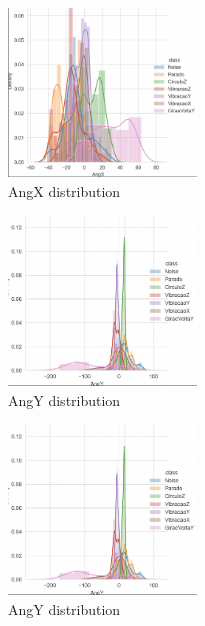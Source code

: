 \begin{figure}[H]
    \center
    \includegraphics[width=5cm]{images/AngXdistribution.png}
    \caption{ AngX distribution }
\end{figure}
\begin{figure}[H]
    \center
    \includegraphics[width=5cm]{images/AngYdistribution.png}
    \caption{ AngY distribution }
\end{figure}
\begin{figure}[H]
    \center
    \includegraphics[width=5cm]{images/AngYdistribution.png}
    \caption{ AngY distribution }
\end{figure}




